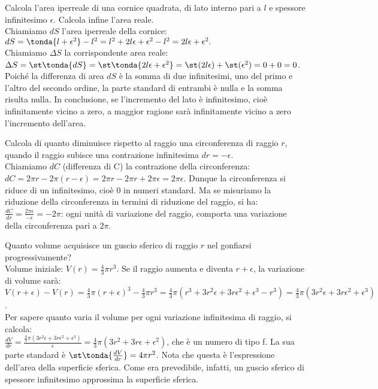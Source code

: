 \begin{esempio}
Calcola l'area iperreale di una cornice quadrata, di lato interno pari a 
\(l\) e
spessore infinitesimo \(\epsilon\). Calcola infine l'area reale.\\
Chiamiamo \(dS\) l'area iperreale della cornice:
\(dS=\tonda{l+\epsilon^2}
-l^2=l^2+2l\epsilon+\epsilon^2-l^2=2l\epsilon+\epsilon^2.\)\\
Chiamiamo \(\Delta S\) la corrispondente area reale:
\(\Delta S=\st\tonda{dS}=\st\tonda{2l\epsilon+\epsilon^2}=
\st(2l\epsilon)+\st(\epsilon^2)=0+0=0\).\\
Poiché la differenza di area \(dS\) è la somma di due infinitesimi, uno del 
primo e 
l'altro del secondo ordine, la parte standard di entrambi è nulla e la 
somma 
risulta nulla. In conclusione, se l'incremento del lato è infinitesimo,
cioè infinitamente vicino a zero, a maggior ragione sarà infinitamente 
vicino
a zero l'incremento dell'area.
\end{esempio}

\begin{esempio}
Calcola di quanto diminuisce rispetto al raggio una circonferenza di raggio 
\(r\),
quando il raggio subisce una contrazione infinitesima \(dr=-\epsilon\).\\
Chiamiamo \(dC\) (differenza di C) la contrazione della circonferenza:
\(dC=2\pi r-2\pi (r-\epsilon)=2\pi r-2\pi r+2\pi \epsilon= 2\pi \epsilon\).
Dunque la circonferenza si riduce di un infinitesimo, cioè \(0\) in numeri 
standard.
Ma se misuriamo la riduzione della circonferenza in termini
di riduzione del raggio, si ha:
\(\frac{dC}{dr}=\frac{2\pi \epsilon}{-\epsilon}=-2\pi\): ogni unità di 
variazione 
del raggio, comporta una variazione della circonferenza pari a \(2\pi\).
\end{esempio}

\begin{esempio}
Quanto volume acquisisce un guscio sferico di raggio \(r\) nel gonfiarsi
progressivamente?\\
Volume iniziale: \(V(r)=\frac{4}{3}\pi r^3\). Se il raggio aumenta e diventa 
\(r+\epsilon\), 
la variazione di volume sarà:\\
\(V(r+\epsilon)-V(r)=\frac{4}{3}\pi (r+\epsilon)^3-\frac{4}{3}\pi r^3=
\frac{4}{3}\pi (r^3+3r^2\epsilon+3r\epsilon^2+\epsilon^3-r^3)=
\frac{4}{3}\pi (3r^2\epsilon+3r\epsilon^2+\epsilon^3)\).\\
Per sapere quanto varia il volume per ogni variazione infinitesima di 
raggio, si calcola:\\
\(\frac{dV}{dr}=\frac{\frac{4}{3}\pi 
(3r^2\epsilon+3r\epsilon^2+\epsilon^3)}{\epsilon}=
\frac{4}{3}\pi (3r^2+3r\epsilon+\epsilon^2)\), che è un numero di tipo f.
La sua parte standard è \(\st\tonda{\frac{dV}{dr}}=4\pi r^2\). Nota che questa
è l'espressione dell'area della superficie sferica. Come era prevedibile, 
infatti, 
un guscio sferico di spessore infinitesimo approssima la superficie sferica.
\end{esempio}

